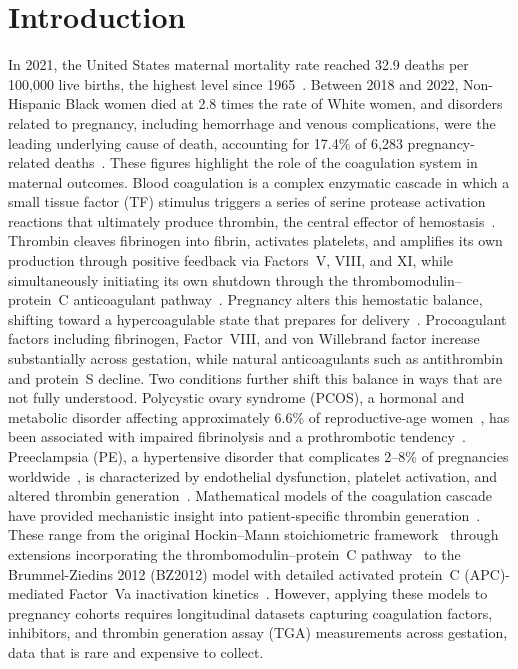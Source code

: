 \section{Introduction}
\label{sec:intro}

In 2021, the United States maternal mortality rate reached 32.9 deaths per 100,000
live births, the highest level since 1965~\citep{Toy2023WSJ,Harris2023}. Between 2018 and 2022,
Non-Hispanic Black women died at 2.8 times the rate of White women, and
disorders related to pregnancy, including hemorrhage and venous
complications, were the leading underlying cause of death, accounting for
17.4\% of 6{,}283 pregnancy-related deaths~\citep{Chen2025}. These figures
highlight the role of the coagulation system in maternal outcomes. Blood coagulation is a complex enzymatic cascade in which a small
tissue factor (TF) stimulus triggers a series of serine protease activation reactions
that ultimately produce thrombin, the central effector of
hemostasis~\citep{Mann2011,Butenas2009}. Thrombin cleaves fibrinogen into fibrin,
activates platelets, and amplifies its own production through positive feedback via
Factors~V, VIII, and XI, while simultaneously initiating its own shutdown through the
thrombomodulin--protein~C anticoagulant pathway~\citep{Hockin2002,Bravo2012}. Pregnancy
alters this hemostatic balance, shifting toward a hypercoagulable state
that prepares for delivery~\citep{Hellgren2003,Grouzi2022,Bremme2003}.
Procoagulant factors including fibrinogen, Factor~VIII, and von Willebrand factor
increase substantially across gestation, while natural anticoagulants such as
antithrombin and protein~S decline. Two conditions further shift this balance in ways that are not fully understood.
Polycystic ovary syndrome (PCOS), a hormonal and metabolic disorder affecting
approximately 6.6\% of reproductive-age women~\citep{Azziz2004}, has been associated with
impaired fibrinolysis and a prothrombotic tendency~\citep{Palomba2015}. Preeclampsia (PE), a hypertensive
disorder that complicates 2--8\% of pregnancies worldwide~\citep{Abalos2014}, is
characterized by endothelial dysfunction, platelet activation, and altered thrombin
generation~\citep{Dusse2011}. Mathematical models of the coagulation cascade have provided mechanistic insight
into patient-specific thrombin generation~\citep{Luan2007,Luan2010}. These range
from the original Hockin--Mann stoichiometric framework~\citep{Hockin2002} through
extensions incorporating the thrombomodulin--protein~C pathway~\citep{Bravo2012}
to the Brummel-Ziedins 2012 (BZ2012) model with detailed activated protein~C
(APC)-mediated Factor~Va inactivation
kinetics~\citep{BrummelZiedins2012}. However, applying these models to pregnancy
cohorts requires longitudinal datasets capturing coagulation factors, inhibitors,
and thrombin generation assay (TGA) measurements across gestation, data that is
rare and expensive to collect.

